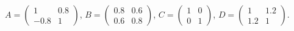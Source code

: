 \documentclass[
]{article}
\begin{document}
\(A=\left(\begin{array}{cc} 1 & 0.8\\-0.8 & 1\end{array}\right)\),
\(B=\left(\begin{array}{cc} 0.8 & 0.6\\0.6 & 0.8\end{array}\right)\),
\(C=\left(\begin{array}{cc} 1 & 0\\0 & 1\end{array}\right)\),
\(D=\left(\begin{array}{cc} 1 & 1.2\\1.2 & 1\end{array}\right)\).
\end{document}

